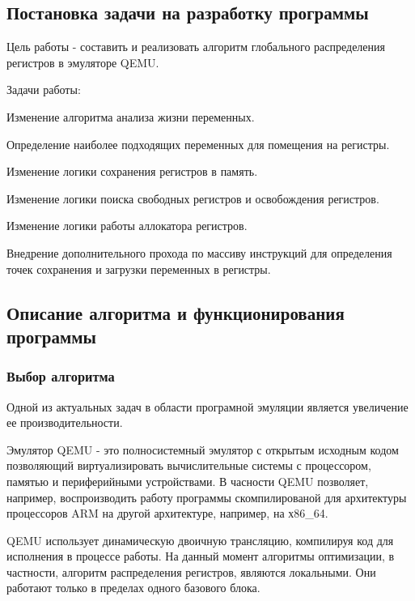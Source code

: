 \subsection{Постановка задачи на разработку программы}
    Цель работы - составить и реализовать алгоритм глобального распределения регистров в эмуляторе QEMU.

\bigskip
Задачи работы:

\smallskip
\begin{my_enumerate}
\item Изменение алгоритма анализа жизни переменных.
\item Определение наиболее подходящих переменных для помещения на регистры.
\item Изменение логики сохранения регистров в память.
\item Изменение логики поиска свободных регистров и освобождения регистров.
\item Изменение логики работы аллокатора регистров.
\item Внедрение дополнительного прохода по массиву инструкций для определения точек сохранения и загрузки переменных в регистры.
\end{my_enumerate}


\subsection{Описание алгоритма и функционирования программы}


\subsubsection{Выбор алгоритма}

Одной из актуальных задач в области програмной эмуляции является увеличение ее производительности.

Эмулятор QEMU - это полносистемный эмулятор с открытым исходным кодом позволяющий виртуализировать вычислительные системы с процессором, памятью и периферийными устройствами. В часности QEMU позволяет, например, воспроизводить работу программы скомпилированой для архитектуры процессоров ARM на другой архитектуре, например, на х86\_64.

QEMU использует динамическую двоичную трансляцию, компилируя код для исполнения в процессе работы. На данный момент алгоритмы оптимизации, в частности, алгоритм распределения регистров, являются локальными. Они работают только
в пределах одного базового блока.

